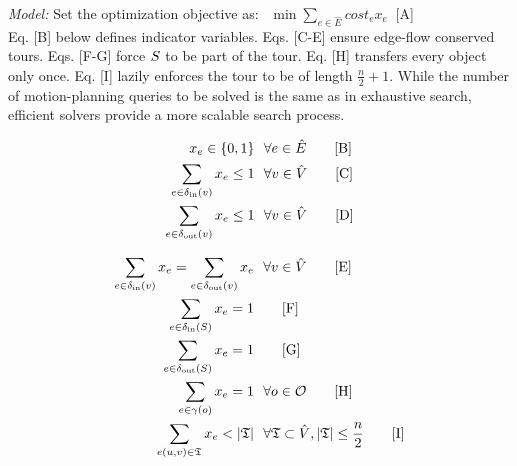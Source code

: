 \textit{Model:} Set the optimization objective as: $\ \ \min \sum_{e \in \hat{E}} cost_e x_e\  $\hspace{.81in} [A]\\ 
Eq. [B] below defines indicator variables. Eqs. [C-E] ensure edge-flow conserved tours. Eqs. [F-G] force $S$ to be part of the tour. Eq. [H] transfers every object only once. Eq. [I] lazily enforces the tour to be of length $ \frac{n}{2} + 1 $. While the number of motion-planning queries to be solved is the same as in exhaustive search, efficient {\milp} solvers \cite{gurobi} provide a more scalable search process.

\noindent\begin{minipage}{.48\textwidth}
\begin{align*}
x_e \in \{ 0,1 \}& \ \ \forall e \in \hat{E} \tag*{[B]}\\
\sum_{e\in\delta_{\rm in}(v)} x_e \leq 1& \ \ \forall v\in \hat{V} \tag*{[C]}\\
\sum_{e\in\delta_{\rm out}(v)} x_e \leq 1& \ \ \forall v\in \hat{V} \tag*{[D]}\\
\end{align*}
\end{minipage}
\noindent\begin{minipage}{.48\textwidth}
\begin{align*}
\sum_{e\in\delta_{\rm in}(v)}x_e = \sum_{e\in\delta_{\rm out}(v)}x_e& \ \ \forall v\in \hat{V} \tag*{[E]}\\
\sum_{e\in\delta_{\rm in}(\startq)} x_e = 1& \tag*{[F]}\\
\sum_{e\in\delta_{\rm out}(\startq)} x_e = 1& \tag*{[G]}\\
\sum_{e\in\gamma(\object)} x_e = 1& \ \  \forall \object\in\objectset \tag*{[H]}\\
\sum_{e(u,v)\in \mathfrak{T}} x_e < |\mathfrak{T}| & \ \  \forall \mathfrak{T} \subset \hat{V}, |\mathfrak{T}| \leq \frac{n}{2} \tag*{[I]}
\label{model:milp}
\end{align*}
\end{minipage}

